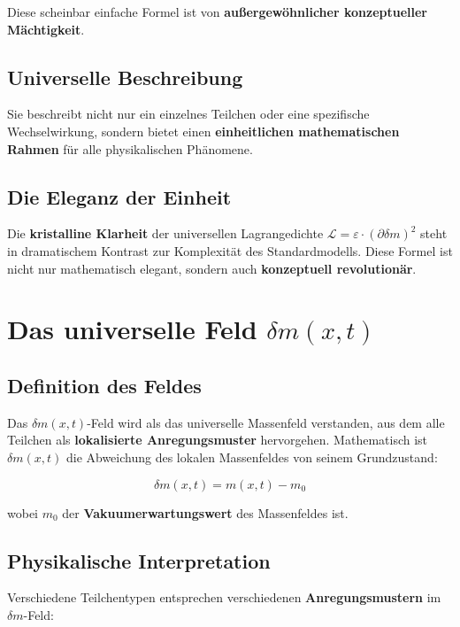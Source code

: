 \documentclass[12pt,a4paper]{report}
\begin{document}
	Diese scheinbar einfache Formel ist von \textbf{außergewöhnlicher konzeptueller Mächtigkeit}.
	
	\subsection{Universelle Beschreibung}
	
	Sie beschreibt nicht nur ein einzelnes Teilchen oder eine spezifische Wechselwirkung, sondern bietet einen \textbf{einheitlichen mathematischen Rahmen} für alle physikalischen Phänomene.
	
	\subsection{Die Eleganz der Einheit}
	
	Die \textbf{kristalline Klarheit} der universellen Lagrangedichte $\mathcal{L} = \varepsilon \cdot (\partial\delta m)^2$ steht in dramatischem Kontrast zur Komplexität des Standardmodells. Diese Formel ist nicht nur mathematisch elegant, sondern auch \textbf{konzeptuell revolutionär}.
	
	\section{Das universelle Feld $\delta m(x,t)$}
	
	\subsection{Definition des Feldes}
	
	Das $\delta m(x,t)$-Feld wird als das universelle Massenfeld verstanden, aus dem alle Teilchen als \textbf{lokalisierte Anregungsmuster} hervorgehen. Mathematisch ist $\delta m(x,t)$ die Abweichung des lokalen Massenfeldes von seinem Grundzustand:
	
	\begin{equation}
		\delta m(x,t) = m(x,t) - m_0
	\end{equation}
	
	wobei $m_0$ der \textbf{Vakuumerwartungswert} des Massenfeldes ist.
	
	\subsection{Physikalische Interpretation}
	
	Verschiedene Teilchentypen entsprechen verschiedenen \textbf{Anregungsmustern} im $\delta m$-Feld:
	
\end{document}

